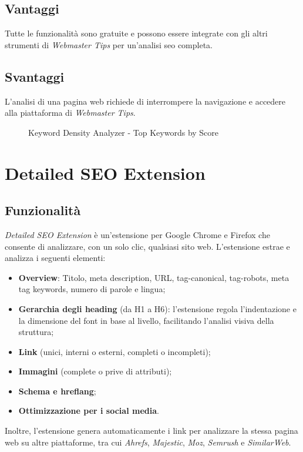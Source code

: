 \subsection{Vantaggi}
\par Tutte le funzionalità sono gratuite e possono essere integrate con gli altri strumenti di \textit{Webmaster Tips} per un'analisi \gls{seo} completa.

\subsection{Svantaggi}
\par L'analisi di una pagina web richiede di interrompere la navigazione e accedere alla piattaforma di \textit{Webmaster Tips}.

\begin{figure}[H]
    \centering 
    \caption{Keyword Density Analyzer - Top Keywords by Score}
\end{figure}

\section{Detailed SEO Extension}

\subsection{Funzionalità}
\par \textit{Detailed SEO Extension} è un'estensione per Google Chrome e Firefox che consente di analizzare, con un solo clic, qualsiasi sito web. L'estensione estrae e analizza i seguenti elementi:
\begin{itemize}
    \item \textbf{Overview}: Titolo, meta description, URL, \gls{tag-canonical}, \gls{tag-robots}, meta tag keywords, numero di parole e lingua;
    \item \textbf{Gerarchia degli heading} (da H1 a H6): l'estensione regola l'indentazione e la dimensione del font in base al livello, facilitando l'analisi visiva della struttura;
    \item \textbf{Link} (unici, interni o esterni, completi o incompleti);
    \item \textbf{Immagini} (complete o prive di attributi);
    \item \textbf{Schema e \gls{hreflang}};
    \item \textbf{Ottimizzazione per i social media}.
\end{itemize}
\vspace{5pt}
\par\noindent Inoltre, l'estensione genera automaticamente i link per analizzare la stessa pagina web su altre piattaforme, tra cui \textit{Ahrefs}, \textit{Majestic}, \textit{Moz}, \textit{Semrush} e \textit{SimilarWeb}.

